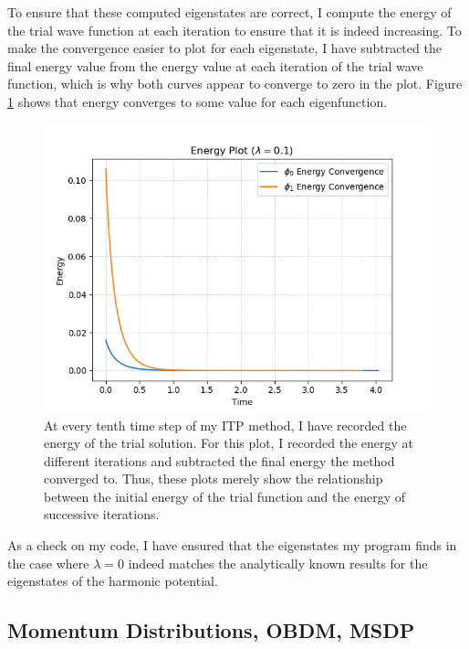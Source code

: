 \documentclass[onecolumn,english,aps,pra]{revtex4}
\begin{document}
To ensure that these computed eigenstates are correct, I compute the energy of the trial wave function at each iteration to ensure that it is indeed increasing. To make the convergence easier to plot for each eigenstate, I have subtracted the final energy value from the energy value at each iteration of the trial wave function, which is why both curves appear to converge to zero in the plot. Figure \ref{fig:EnergyConvergence} shows that energy converges to some value for each eigenfunction.
%
\begin{figure}[H]
\center
\includegraphics[scale=0.8]{../Plots/Anharmonic/EnergyConvergence}
\caption{At every tenth time step of my ITP method, I have recorded the energy of the trial solution. For this plot, I recorded the energy at different iterations and subtracted the final energy the method converged to. Thus, these plots merely show the relationship between the initial energy of the trial function and the energy of successive iterations.}
\label{fig:EnergyConvergence}
\end{figure}
%
As a check on my code, I have ensured that the eigenstates my program finds in the case where $\lambda = 0$ indeed matches the analytically known results for the eigenstates of the harmonic potential.

\subsection*{Momentum Distributions, OBDM, MSDP}
\end{document}

